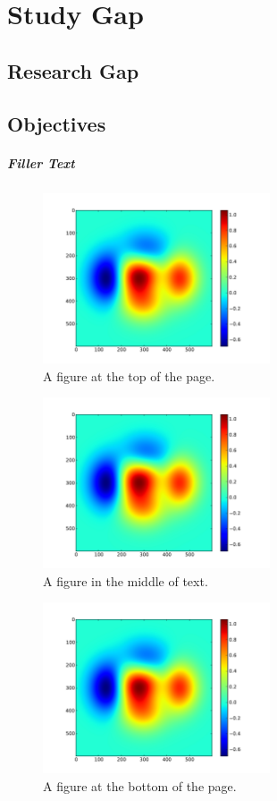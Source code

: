 \chapter{Study Gap}

\section{Research Gap}

\section{Objectives}

\paragraph{Filler Text} \lipsum[1]
%
\begin{figure}[t]
  \centering
  \includegraphics[width=0.6\textwidth]{Chapter-2/figs/color}
  \caption{A figure at the top of the page.}
  \label{fig:ch3.1}
\end{figure}
%
\lipsum[2]
%
\begin{figure}[!h]
  \centering
  \includegraphics[width=0.6\textwidth]{Chapter-2/figs/color}
  \caption{A figure in the middle of text.}
  \label{fig:ch3.2}
\end{figure}
%
\begin{figure}[!b]
  \centering
  \includegraphics[width=0.6\textwidth]{Chapter-2/figs/color}
  \caption{A figure at the bottom of the page.}
  \label{fig:ch3.3}
\end{figure}
%
\lipsum[3]
